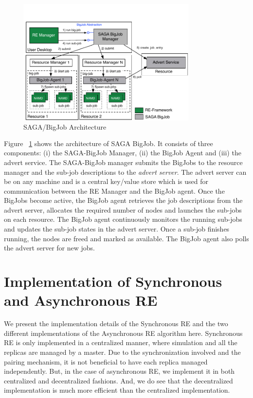 \documentclass{rspublic}
\begin{document}
\begin{figure}[t]
      \centering
          \includegraphics[width=0.8\textwidth]{Bigjob_arch.pdf}
          \caption{\footnotesize SAGA/BigJob Architecture
              }
      \label{fig:bigjob}
\end{figure}

Figure ~\ref{fig:bigjob} shows the architecture of SAGA BigJob.
It consists of three components: (i) the SAGA-BigJob Manager, (ii) the BigJob Agent and (iii) the advert service. The SAGA-BigJob manager submits the BigJobs to the resource manager and the sub-job descriptions to the \emph{advert server}. The advert server can be on any machine and is a central key/value store which is used for communication between the RE Manager and the BigJob agent. Once the BigJobs become active, the BigJob agent retrieves the job descriptions from the advert server, allocates the required number of nodes and launches the sub-jobs on each resource. The BigJob agent continuously monitors the running sub-jobs and updates the sub-job states in the advert server. Once a sub-job finishes running, the nodes are freed and marked as available. The BigJob agent also polls the advert server for new jobs.


\section{Implementation of Synchronous and Asynchronous RE}
We present the implementation details of the Synchronous RE and the two different implementations of the Asynchronous RE algorithm here. Synchronous RE is only implemented in a centralized manner, where simulation and all the replicas are managed by a master. Due to the synchronization involved and the pairing mechanism, it is not beneficial to have each replica managed independently. But, in the case of asynchronous RE, we implement it in both centralized and decentralized  fashions. And, we do see that the decentralized implementation is much more efficient than the centralized implementation.
\end{document}
